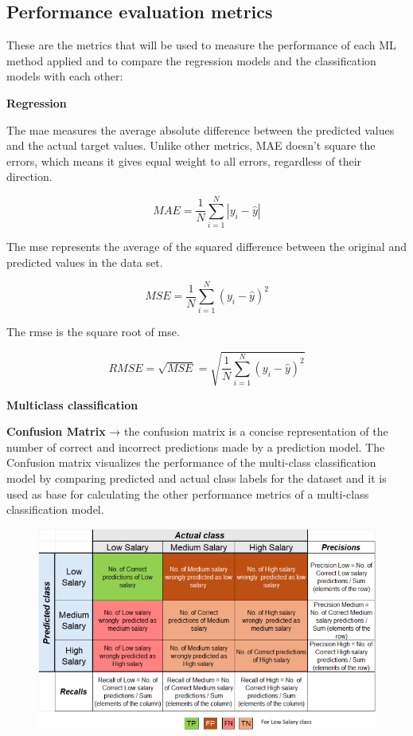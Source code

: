 \documentclass[11pt,a4paper]{article}
\newcommand{\SubItem}[1]{
  {\setlength\itemindent{13pt} \item[◦] #1}
}
\begin{document}
\subsection{Performance evaluation metrics} 
These are the metrics that will be used to measure the performance of each ML method applied and to compare the regression models and the classification models with each other:
\begin{itemize}
\item \textbf{Regression}
\SubItem{The \acrfull{mae} measures the average absolute difference between the predicted values and the actual target values. Unlike other metrics, MAE doesn’t square the errors, which means it gives equal weight to all errors, regardless of their direction.}
\begin{displaymath}
MAE = \frac{1}{N} \sum_{i=1}^{N} | y_i  - \hat{y} | 
\end{displaymath}
\SubItem{The \acrfull{mse} represents the average of the squared difference between the original and predicted values in the data set.}
\begin{displaymath}
MSE = \frac{1}{N} \sum_{i=1}^{N} (y_i  - \hat{y})^2
\end{displaymath}
\SubItem{The \acrfull{rmse} is the square root of \acrshort{mse}.}
\begin{displaymath}
RMSE = \sqrt{MSE} = \sqrt{ \frac{1}{N} \sum_{i=1}^{N} (y_i  - \hat {y})^2}
\end{displaymath}
\item \textbf{Multiclass classification}
\SubItem{\textbf{Confusion Matrix} → the confusion matrix is a concise representation of the number of correct and incorrect predictions made by a prediction model. The Confusion matrix visualizes the performance of the multi-class classification model by comparing predicted and actual class labels for the dataset and it is used as base for calculating the other performance metrics of a multi-class classification model.
\begin{figure}
    \centering
    \includegraphics[width=1\linewidth]{ICS-5110-Table-02.png}

\end{figure}}
\end{itemize}
\end{document}
